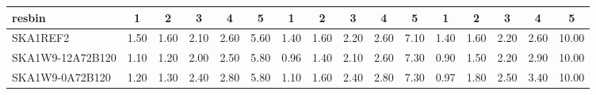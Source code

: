 \begin{table}[!htp]
{{\begin{tabular}{|lccccc||ccccc||ccccc|}
 resbin  &1 & 2 & 3 & 4 & 5 & 1 & 2 & 3 & 4 & 5 & 1 & 2 & 3 & 4 & 5 \\ \hline
SKA1REF2 & 1.50 \cellcolor{blue!60.00} & 1.60 \cellcolor{red!60.00} & 2.10 \cellcolor{green!28.50} & 2.60 \cellcolor{orange!32.00} & 5.60 \cellcolor{purple!18.00} & 1.40 \cellcolor{blue!60.00} & 1.60 \cellcolor{red!60.00} & 2.20 \cellcolor{green!32.00} & 2.60 \cellcolor{orange!18.00} & 7.10 \cellcolor{purple!18.00} & 1.40 \cellcolor{blue!60.00} & 1.60 \cellcolor{red!32.00} & 2.20 \cellcolor{green!18.00} & 2.60 \cellcolor{orange!18.00} & 10.00 \cellcolor{purple!18.00}\\ \hline 
SKA1W9-12A72B120 & 1.10 \cellcolor{blue!18.00} & 1.20 \cellcolor{red!18.00} & 2.00 \cellcolor{green!18.00} & 2.50 \cellcolor{orange!18.00} & 5.80 \cellcolor{purple!60.00} & 0.96 \cellcolor{blue!18.00} & 1.40 \cellcolor{red!18.00} & 2.10 \cellcolor{green!18.00} & 2.60 \cellcolor{orange!18.00} & 7.30 \cellcolor{purple!60.00} & 0.90 \cellcolor{blue!18.00} & 1.50 \cellcolor{red!18.00} & 2.20 \cellcolor{green!18.00} & 2.90 \cellcolor{orange!33.75} & 10.00 \cellcolor{purple!18.00}\\ \hline 
SKA1W9-0A72B120 & 1.20 \cellcolor{blue!28.50} & 1.30 \cellcolor{red!28.50} & 2.40 \cellcolor{green!60.00} & 2.80 \cellcolor{orange!60.00} & 5.80 \cellcolor{purple!60.00} & 1.10 \cellcolor{blue!31.36} & 1.60 \cellcolor{red!60.00} & 2.40 \cellcolor{green!60.00} & 2.80 \cellcolor{orange!60.00} & 7.30 \cellcolor{purple!60.00} & 0.97 \cellcolor{blue!23.88} & 1.80 \cellcolor{red!60.00} & 2.50 \cellcolor{green!60.00} & 3.40 \cellcolor{orange!60.00} & 10.00 \cellcolor{purple!18.00}\\ \hline 
\end{tabular}}
\hspace{1cm} 
}
\end{table}
